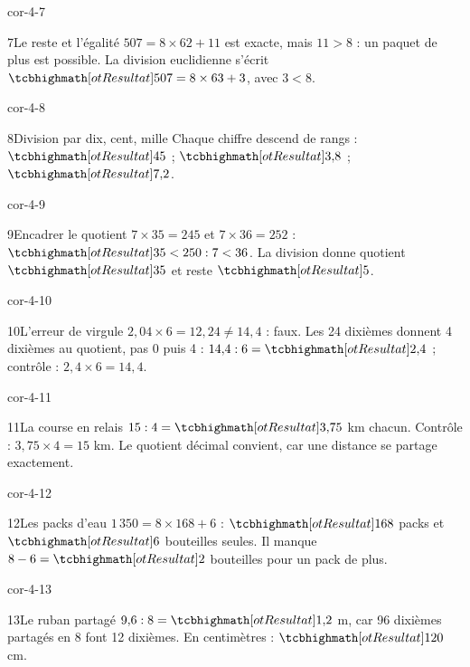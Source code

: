 \begin{blocLivre}{cor-4-7}\begin{corrige}{7}{Le reste et l’égalité}
$507=8\times62+11$ est exacte, mais $11>8$ : un paquet de plus est possible. La division euclidienne s’écrit $\res{507=8\times63+3}$, avec $3<8$.
\end{corrige}\end{blocLivre}
\begin{blocLivre}{cor-4-8}\begin{corrige}{8}{Division par dix, cent, mille}
Chaque chiffre descend de rangs : $\res{45}$ ; $\res{3{,}8}$ ; $\res{7{,}2}$.
\end{corrige}\end{blocLivre}
\begin{blocLivre}{cor-4-9}\begin{corrige}{9}{Encadrer le quotient}
$7\times35=245$ et $7\times36=252$ : $\res{35<250:7<36}$. La division donne quotient $\res{35}$ et reste $\res5$.
\end{corrige}\end{blocLivre}
\begin{blocLivre}{cor-4-10}\begin{corrige}{10}{L’erreur de virgule}
$2{,}04\times6=12{,}24\ne14{,}4$ : faux. Les 24 dixièmes donnent 4 dixièmes au quotient, pas 0 puis 4 : $14{,}4:6=\res{2{,}4}$ ; contrôle : $2{,}4\times6=14{,}4$.
\end{corrige}\end{blocLivre}
\begin{blocLivre}{cor-4-11}\begin{corrige}{11}{La course en relais}
$15:4=\res{3{,}75}$ km chacun. Contrôle : $3{,}75\times4=15$ km. Le quotient décimal convient, car une distance se partage exactement.
\end{corrige}\end{blocLivre}
\begin{blocLivre}{cor-4-12}\begin{corrige}{12}{Les packs d’eau}
$1\,350=8\times168+6$ : $\res{168}$ packs et $\res6$ bouteilles seules. Il manque $8-6=\res2$ bouteilles pour un pack de plus.
\end{corrige}\end{blocLivre}
\begin{blocLivre}{cor-4-13}\begin{corrige}{13}{Le ruban partagé}
$9{,}6:8=\res{1{,}2}$ m, car 96 dixièmes partagés en 8 font 12 dixièmes. En centimètres : $\res{120}$ cm.
\end{corrige}\end{blocLivre}
